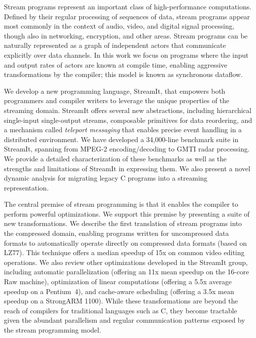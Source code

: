 Stream programs represent an important class of high-performance
computations.  Defined by their regular processing of sequences of
data, stream programs appear most commonly in the context of audio,
video, and digital signal processing, though also in networking,
encryption, and other areas.  Stream programs can be naturally
represented as a graph of independent actors that communicate
explicitly over data channels.  In this work we focus on programs
where the input and output rates of actors are known at compile time,
enabling aggressive transformations by the compiler; this model is
known as synchronous dataflow.

We develop a new programming language, StreamIt, that empowers both
programmers and compiler writers to leverage the unique properties of
the streaming domain.  StreamIt offers several new abstractions,
including hierarchical single-input single-output streams, composable
primitives for data reordering, and a mechanism called {\it teleport
messaging} that enables precise event handling in a distributed
environment.  We have developed a 34,000-line benchmark suite in
StreamIt, spanning from MPEG-2 encoding/decoding to GMTI radar
processing.  We provide a detailed characterization of these
benchmarks as well as the strengths and limitations of StreamIt in
expressing them.  We also present a novel dynamic analysis for
migrating legacy C programs into a streaming representation.

The central premise of stream programming is that it enables the
compiler to perform powerful optimizations.  We support this premise
by presenting a suite of new transformations.  We describe the first
translation of stream programs into the compressed domain, enabling
programs written for uncompressed data formats to automatically
operate directly on compressed data formats (based on LZ77).  This
technique offers a median speedup of 15x on common video editing
operations.  We also review other optimizations developed in the
StreamIt group, including automatic parallelization (offering an 11x
mean speedup on the 16-core Raw machine), optimization of linear
computations (offering a 5.5x average speedup on a Pentium~4), and
cache-aware scheduling (offering a 3.5x mean speedup on a StrongARM
1100).  While these transformations are beyond the reach of compilers
for traditional languages such as C, they become tractable given the
abundant parallelism and regular communication patterns exposed by the
stream programming model.
